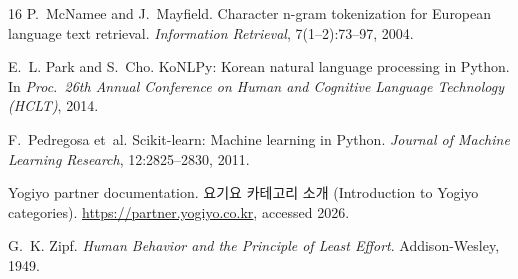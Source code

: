 \documentclass[10pt,twocolumn]{article}
\begin{document}
\begin{thebibliography}{16}
P.~McNamee and J.~Mayfield.
\newblock Character n-gram tokenization for European language text
retrieval.
\newblock \emph{Information Retrieval}, 7(1--2):73--97, 2004.

E.~L. Park and S.~Cho.
\newblock KoNLPy: Korean natural language processing in Python.
\newblock In \emph{Proc.\ 26th Annual Conference on Human and Cognitive
Language Technology (HCLT)}, 2014.

F.~Pedregosa et~al.
\newblock Scikit-learn: Machine learning in Python.
\newblock \emph{Journal of Machine Learning Research}, 12:2825--2830, 2011.

Yogiyo partner documentation.
\newblock 요기요 카테고리 소개 (Introduction to Yogiyo categories).
\newblock \url{https://partner.yogiyo.co.kr}, accessed 2026.

G.~K. Zipf.
\newblock \emph{Human Behavior and the Principle of Least Effort}.
\newblock Addison-Wesley, 1949.

\end{thebibliography}
\end{document}
